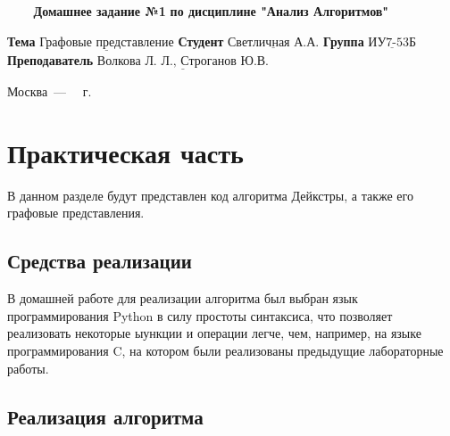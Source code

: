 \documentclass[a4paper,14pt, unknownkeysallowed]{extreport}
\begin{document}
\begin{titlepage}
	
	\begin{center}
		\noindent\begin{minipage}{1.3\textwidth}\centering
		\Large\textbf{   ~~~ Домашнее задание №1}\newline
		\textbf{по дисциплине "Анализ Алгоритмов"}\newline\newline\newline
		\end{minipage}
	\end{center}
	
	\noindent\textbf{Тема} 			$\underline{\text{Графовые представление}}$\newline\newline
	\noindent\textbf{Студент} 		$\underline{\text{Светличная А.А.}}$\newline\newline
	\noindent\textbf{Группа} 		$\underline{\text{ИУ7-53Б}}$\newline\newline
	\noindent\textbf{Преподаватель} $\underline{\text{Волкова Л. Л., Строганов Ю.В.}}$\newline
	
	\begin{center}
		\vfill
		Москва~---~\the\year
		~г.
	\end{center}
	\restoregeometry
\end{titlepage}
	
	\setcounter{page}{2}
	\tableofcontents
	
\newpage
	
\chapter{Практическая часть}

В данном разделе будут представлен код алгоритма Дейкстры, а также его графовые представления.

\section{Средства реализации}
В домашней работе для реализации алгоритма был выбран язык программирования Python в силу простоты синтаксиса, что позволяет реализовать некоторые ыункции и операции легче, чем, например, на языке программирования C, на котором были реализованы предыдущие лабораторные работы. 

\clearpage

\section{Реализация алгоритма}
\end{document}
